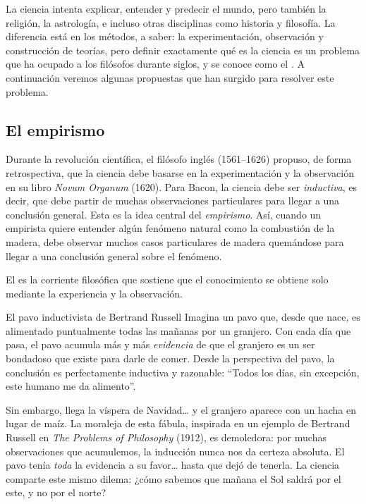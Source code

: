 La ciencia intenta explicar, entender y predecir el mundo, pero también la religión, la astrología, e incluso otras disciplinas como historia y filosofía.
La diferencia está en los métodos, a saber: la experimentación, observación y construcción de teorías, pero definir exactamente qué es la ciencia es un problema que ha ocupado a los filósofos durante siglos, y se conoce como el .
A continuación veremos algunas propuestas que han surgido para resolver este problema.

\subsection*{El empirismo}
\label{sub:elemprismo}
Durante la revolución científica, el filósofo inglés  (1561--1626) propuso, de forma retrospectiva, que la ciencia debe basarse en la experimentación y la observación en su libro \emph{Novum Organum} (1620)\cite{Bacon1620}.
Para Bacon, la ciencia debe ser \emph{inductiva}, es decir, que debe partir de muchas observaciones particulares para llegar a una conclusión general.
Esta es la idea central del \emph{empirismo}.
Así, cuando un empirista quiere entender algún fenómeno natural como la combustión de la madera, debe observar muchos casos particulares de madera quemándose para llegar a una conclusión general sobre el fenómeno.

\begin{remember}
	\label{rem:empirismo}
	El  es la corriente filosófica que sostiene que el
	conocimiento se obtiene solo mediante la experiencia y la observación.
\end{remember}

\begin{digress}{El pavo inductivista de Bertrand Russell}
	Imagina un pavo que, desde que nace, es alimentado puntualmente todas las mañanas por un granjero.
	Con cada día que pasa, el pavo acumula más y más \emph{evidencia} de que el granjero es un ser bondadoso que existe para darle de comer.
	Desde la perspectiva del pavo, la conclusión es perfectamente inductiva y razonable: “Todos los días, sin excepción, este humano me da alimento”.

	Sin embargo, llega la víspera de Navidad… y el granjero aparece con un hacha en lugar de maíz.
	La moraleja de esta fábula, inspirada en un ejemplo de Bertrand Russell en \emph{The Problems of Philosophy} (1912)\cite{Russell1912}, es demoledora: por muchas observaciones que acumulemos, la inducción nunca nos da certeza absoluta.
	El pavo tenía \emph{toda} la evidencia a su favor… hasta que dejó de tenerla.
	La ciencia comparte este mismo dilema: ¿cómo sabemos que mañana el Sol saldrá por el este, y no por el norte?
\end{digress}

